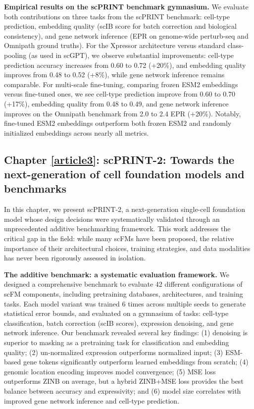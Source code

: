 \textbf{Empirical results on the scPRINT benchmark gymnasium.} We evaluate both contributions on
three tasks from the \gls{scPRINT} benchmark: cell-type prediction, embedding quality (\gls{scIB}
score for batch correction and biological consistency), and gene network inference (\gls{EPR} on
genome-wide perturb-seq and Omnipath ground truths). For the Xpressor architecture versus standard
class-pooling (as used in \gls{scGPT}), we observe substantial improvements: cell-type prediction
accuracy increases from 0.60 to 0.72 (+20\%), and embedding quality improves from 0.48 to 0.52
(+8\%), while gene network inference remains comparable. For multi-scale fine-tuning, comparing
frozen \gls{ESM}2 embeddings versus fine-tuned ones, we see cell-type prediction improve from 0.60
to 0.70 (+17\%), embedding quality from 0.48 to 0.49, and gene network inference improves on the
Omnipath benchmark from 2.0 to 2.4 \gls{EPR} (+20\%). Notably, fine-tuned \gls{ESM}2 embeddings
outperform both frozen \gls{ESM}2 and randomly initialized embeddings across nearly all metrics.

\subsection{Chapter \ref{article3}: scPRINT-2: Towards the next-generation of cell foundation models and benchmarks}

In this chapter, we present \gls{scPRINT}-2, a next-generation single-cell foundation model whose
design decisions were systematically validated through an unprecedented additive benchmarking
framework. This work addresses the critical gap in the field: while many \glspl{scFM} have been
proposed, the relative importance of their architectural choices, training strategies, and data
modalities has never been rigorously assessed in isolation.

\textbf{The additive benchmark: a systematic evaluation framework.} We designed a comprehensive
benchmark to evaluate 42 different configurations of \gls{scFM} components, including pretraining
databases, architectures, and training tasks. Each model variant was trained 6 times across
multiple seeds to generate statistical error bounds, and evaluated on a gymnasium of tasks:
cell-type classification, batch correction (\gls{scIB} scores), expression denoising, and gene
network inference. Our benchmark revealed several key findings: (1) denoising is superior to
masking as a pretraining task for classification and embedding quality; (2) un-normalized
expression outperforms normalized input; (3) \gls{ESM}-based gene tokens significantly outperform
learned embeddings from scratch; (4) genomic location encoding improves model convergence; (5)
\gls{MSE} loss outperforms \gls{ZINB} on average, but a hybrid \gls{ZINB}+MSE loss provides the
best balance between accuracy and expressivity; and (6) model size correlates with improved gene
network inference and cell-type prediction.

